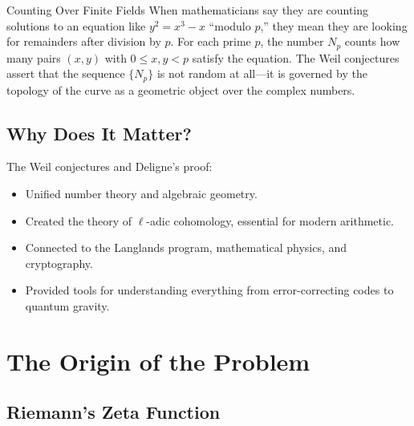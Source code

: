 \begin{knowledgebridge}{Counting Over Finite Fields}
When mathematicians say they are counting solutions to an equation like $y^2 = x^3 - x$ ``modulo $p$,'' they mean they are looking for remainders after division by $p$. For each prime $p$, the number $N_p$ counts how many pairs $(x,y)$ with $0 \leq x,y < p$ satisfy the equation. The Weil conjectures assert that the sequence $\{N_p\}$ is not random at all---it is governed by the topology of the curve as a geometric object over the complex numbers.
\end{knowledgebridge}

\subsection{Why Does It Matter?}

The Weil conjectures and Deligne's proof:
\begin{itemize}
\item Unified number theory and algebraic geometry.
\item Created the theory of $\ell$-adic cohomology, essential for modern arithmetic.
\item Connected to the Langlands program, mathematical physics, and cryptography.
\item Provided tools for understanding everything from error-correcting codes to quantum gravity.
\end{itemize}


\begin{center}
\end{center}

\section{The Origin of the Problem}

\subsection{Riemann's Zeta Function}

